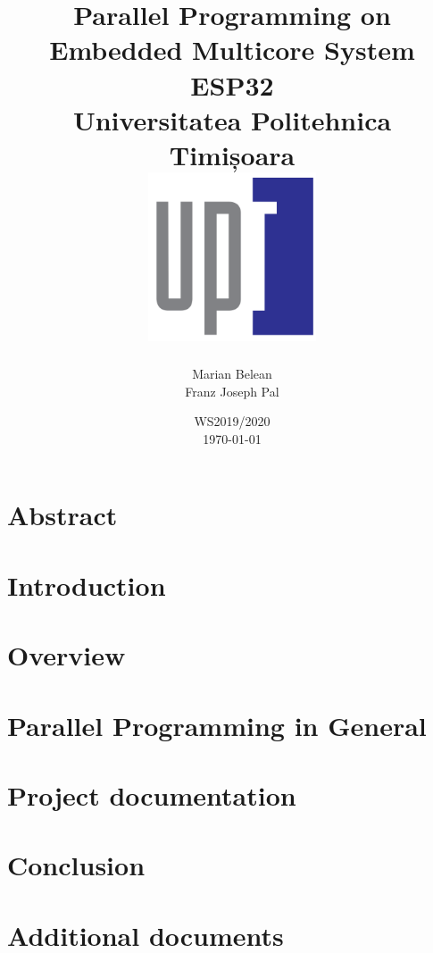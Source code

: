 \documentclass[12pt, twoside]{report}
\title{
	{Parallel Programming on Embedded Multicore System ESP32\bigskip}\\
	{\large Universitatea Politehnica Timișoara\bigskip\bigskip}\\
	{\includegraphics[width=50mm,scale=0.5]{upt_logo.png}}
}
\author{ Marian Belean\\ Franz Joseph Pal }
\date{ WS2019/2020 \\ \today}
\begin{document}
\maketitle


\chapter*{Abstract}




\tableofcontents

\chapter{Introduction}\label{chap:introduction}



\chapter{Overview}\label{chap:overview}


\chapter{Parallel Programming in General}\label{chap:parallelprg}


\chapter{Project documentation}\label{chap:documentation}


\chapter{Conclusion}\label{chap:conclusion}


\appendix
\chapter{Additional documents}


\printbibliography
\end{document}
